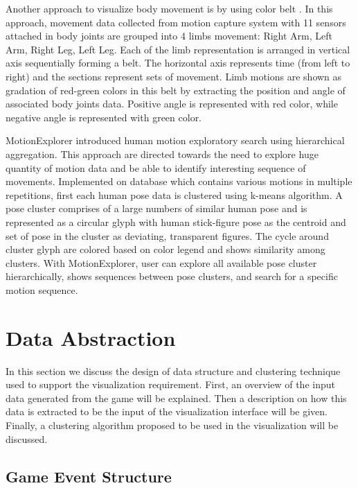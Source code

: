 \documentclass{vgtc}                          %
\begin{document}
Another approach to visualize body movement is by using color belt \cite{yuko}. In this approach, movement data collected from motion capture system with 11 sensors attached in body joints are grouped into 4 limbs movement: Right Arm, Left Arm, Right Leg, Left Leg. Each of the limb representation is arranged in vertical axis sequentially forming a belt. The horizontal axis represents time (from left to right) and the sections represent sets of movement. Limb motions are shown as gradation of red-green colors in this belt by extracting the position and angle of associated body joints data. Positive angle is represented with red color, while negative angle is represented with green color.

MotionExplorer \cite{bernard2013} introduced human motion exploratory search using hierarchical aggregation. This approach are directed towards the need to explore huge quantity of motion data and be able to identify interesting sequence of movements. Implemented on database which contains various motions in multiple repetitions, first each human pose data is clustered using k-means algorithm. A pose cluster comprises of a large numbers of similar human pose and is represented as a circular glyph with human stick-figure pose as the centroid and set of pose in the cluster as deviating, transparent figures. The cycle around cluster glyph are colored based on color legend and shows similarity among clusters. With MotionExplorer, user can explore all available pose cluster hierarchically, shows sequences between pose clusters, and search for a specific motion sequence.

\section{Data Abstraction}
In this section we discuss the design of data structure and clustering technique used to support the visualization requirement. First, an overview of the input data generated from the game will be explained. Then a description on how this data is extracted to be the input of the visualization interface will be given. Finally, a clustering algorithm proposed to be used in the visualization will be discussed.

\subsection{Game Event Structure}
\end{document}
